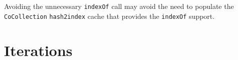 \documentclass[
]{ceurart}
\begin{document}
Avoiding the unnecessary \verb!indexOf! call may avoid the need to populate the \verb!CoCollection! \verb!hash2index! cache that provides the \verb!indexOf! support.







\section{Iterations}\label{Iterations}
\end{document}
